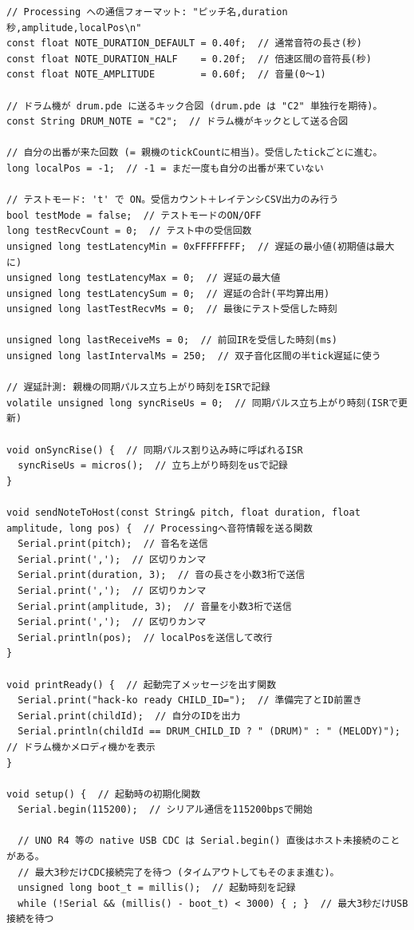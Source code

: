 \documentclass[uplatex,dvipdfmx]{jlreq}
\begin{document}
\begin{lstlisting}
// Processing への通信フォーマット: "ピッチ名,duration秒,amplitude,localPos\n"
const float NOTE_DURATION_DEFAULT = 0.40f;  // 通常音符の長さ(秒)
const float NOTE_DURATION_HALF    = 0.20f;  // 倍速区間の音符長(秒)
const float NOTE_AMPLITUDE        = 0.60f;  // 音量(0〜1)

// ドラム機が drum.pde に送るキック合図 (drum.pde は "C2" 単独行を期待)。
const String DRUM_NOTE = "C2";  // ドラム機がキックとして送る合図

// 自分の出番が来た回数 (= 親機のtickCountに相当)。受信したtickごとに進む。
long localPos = -1;  // -1 = まだ一度も自分の出番が来ていない

// テストモード: 't' で ON。受信カウント＋レイテンシCSV出力のみ行う
bool testMode = false;  // テストモードのON/OFF
long testRecvCount = 0;  // テスト中の受信回数
unsigned long testLatencyMin = 0xFFFFFFFF;  // 遅延の最小値(初期値は最大に)
unsigned long testLatencyMax = 0;  // 遅延の最大値
unsigned long testLatencySum = 0;  // 遅延の合計(平均算出用)
unsigned long lastTestRecvMs = 0;  // 最後にテスト受信した時刻

unsigned long lastReceiveMs = 0;  // 前回IRを受信した時刻(ms)
unsigned long lastIntervalMs = 250;  // 双子音化区間の半tick遅延に使う

// 遅延計測: 親機の同期パルス立ち上がり時刻をISRで記録
volatile unsigned long syncRiseUs = 0;  // 同期パルス立ち上がり時刻(ISRで更新)

void onSyncRise() {  // 同期パルス割り込み時に呼ばれるISR
  syncRiseUs = micros();  // 立ち上がり時刻をusで記録
}

void sendNoteToHost(const String& pitch, float duration, float amplitude, long pos) {  // Processingへ音符情報を送る関数
  Serial.print(pitch);  // 音名を送信
  Serial.print(',');  // 区切りカンマ
  Serial.print(duration, 3);  // 音の長さを小数3桁で送信
  Serial.print(',');  // 区切りカンマ
  Serial.print(amplitude, 3);  // 音量を小数3桁で送信
  Serial.print(',');  // 区切りカンマ
  Serial.println(pos);  // localPosを送信して改行
}

void printReady() {  // 起動完了メッセージを出す関数
  Serial.print("hack-ko ready CHILD_ID=");  // 準備完了とID前置き
  Serial.print(childId);  // 自分のIDを出力
  Serial.println(childId == DRUM_CHILD_ID ? " (DRUM)" : " (MELODY)");  // ドラム機かメロディ機かを表示
}

void setup() {  // 起動時の初期化関数
  Serial.begin(115200);  // シリアル通信を115200bpsで開始

  // UNO R4 等の native USB CDC は Serial.begin() 直後はホスト未接続のことがある。
  // 最大3秒だけCDC接続完了を待つ (タイムアウトしてもそのまま進む)。
  unsigned long boot_t = millis();  // 起動時刻を記録
  while (!Serial && (millis() - boot_t) < 3000) { ; }  // 最大3秒だけUSB接続を待つ


\end{lstlisting}
\end{document}
